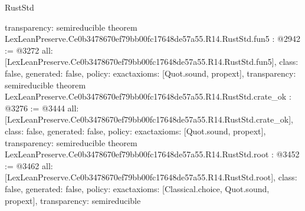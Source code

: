 \begin{lexlean}{RustStd}
\begin{coremodule}
{  transparency: semireducible
}
theorem LexLeanPreserve.Ce0b3478670ef79bb00fc17648de57a55.R14.RustStd.fun5 : @2942 := @3272 {
  all: [LexLeanPreserve.Ce0b3478670ef79bb00fc17648de57a55.R14.RustStd.fun5],
  class: false,
  generated: false,
  policy: exact{axioms: [Quot.sound, propext]},
  transparency: semireducible
}
theorem LexLeanPreserve.Ce0b3478670ef79bb00fc17648de57a55.R14.RustStd.crate_ok : @3276 := @3444 {
  all: [LexLeanPreserve.Ce0b3478670ef79bb00fc17648de57a55.R14.RustStd.crate_ok],
  class: false,
  generated: false,
  policy: exact{axioms: [Quot.sound, propext]},
  transparency: semireducible
}
theorem LexLeanPreserve.Ce0b3478670ef79bb00fc17648de57a55.R14.RustStd.root : @3452 := @3462 {
  all: [LexLeanPreserve.Ce0b3478670ef79bb00fc17648de57a55.R14.RustStd.root],
  class: false,
  generated: false,
  policy: exact{axioms: [Classical.choice, Quot.sound, propext]},
  transparency: semireducible
}


\end{coremodule}
\end{lexlean}
